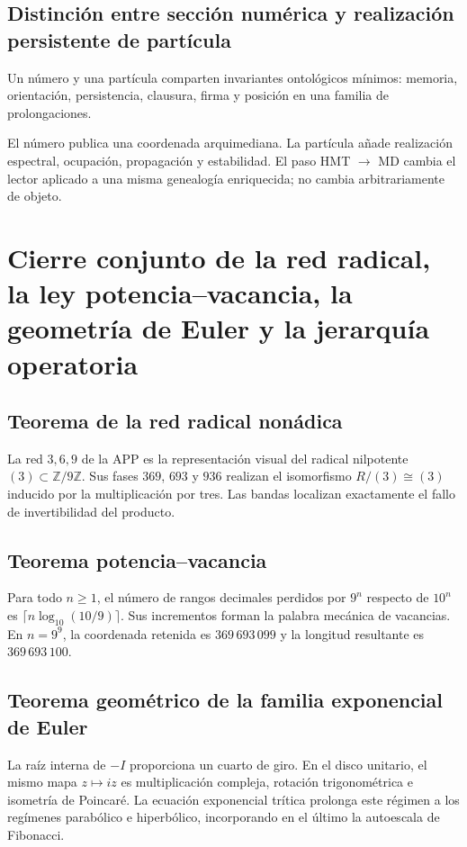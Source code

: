 \subsection{Distinción entre sección numérica y realización persistente de partícula}

Un número y una partícula comparten invariantes ontológicos mínimos: memoria, orientación, persistencia, clausura, firma y posición en una familia de prolongaciones.

El número publica una coordenada arquimediana. La partícula añade realización espectral, ocupación, propagación y estabilidad. El paso HMT \(\to\) MD cambia el lector aplicado a una misma genealogía enriquecida; no cambia arbitrariamente de objeto.


\section{Cierre conjunto de la red radical, la ley potencia--vacancia, la geometría de Euler y la jerarquía operatoria}

\subsection{Teorema de la red radical nonádica}

La red \(3,6,9\) de la APP es la representación visual del radical nilpotente \((3)\subset\mathbb Z/9\mathbb Z\). Sus fases \(369\), \(693\) y \(936\) realizan el isomorfismo \(R/(3)\cong(3)\) inducido por la multiplicación por tres. Las bandas localizan exactamente el fallo de invertibilidad del producto.

\subsection{Teorema potencia--vacancia}

Para todo \(n\ge1\), el número de rangos decimales perdidos por \(9^n\) respecto de \(10^n\) es \(\lceil n\log_{10}(10/9)\rceil\). Sus incrementos forman la palabra mecánica de vacancias. En \(n=9^9\), la coordenada retenida es \(369\,693\,099\) y la longitud resultante es \(369\,693\,100\).

\subsection{Teorema geométrico de la familia exponencial de Euler}

La raíz interna de \(-I\) proporciona un cuarto de giro. En el disco unitario, el mismo mapa \(z\mapsto iz\) es multiplicación compleja, rotación trigonométrica e isometría de Poincaré. La ecuación exponencial trítica prolonga este régimen a los regímenes parabólico e hiperbólico, incorporando en el último la autoescala de Fibonacci.

